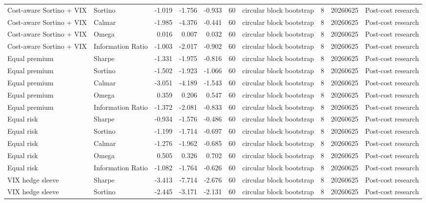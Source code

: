 \begin{tabular}{llrrrrlrrl}
Cost-aware Sortino + VIX & Sortino & -1.019 & -1.756 & -0.933 & 60 & circular block bootstrap & 8 & 20260625 & Post-cost research \\
Cost-aware Sortino + VIX & Calmar & -1.985 & -4.376 & -0.441 & 60 & circular block bootstrap & 8 & 20260625 & Post-cost research \\
Cost-aware Sortino + VIX & Omega & 0.016 & 0.007 & 0.032 & 60 & circular block bootstrap & 8 & 20260625 & Post-cost research \\
Cost-aware Sortino + VIX & Information Ratio & -1.003 & -2.017 & -0.902 & 60 & circular block bootstrap & 8 & 20260625 & Post-cost research \\
Equal premium & Sharpe & -1.331 & -1.975 & -0.816 & 60 & circular block bootstrap & 8 & 20260625 & Post-cost research \\
Equal premium & Sortino & -1.502 & -1.923 & -1.066 & 60 & circular block bootstrap & 8 & 20260625 & Post-cost research \\
Equal premium & Calmar & -3.051 & -4.189 & -1.543 & 60 & circular block bootstrap & 8 & 20260625 & Post-cost research \\
Equal premium & Omega & 0.359 & 0.206 & 0.547 & 60 & circular block bootstrap & 8 & 20260625 & Post-cost research \\
Equal premium & Information Ratio & -1.372 & -2.081 & -0.833 & 60 & circular block bootstrap & 8 & 20260625 & Post-cost research \\
Equal risk & Sharpe & -0.934 & -1.576 & -0.486 & 60 & circular block bootstrap & 8 & 20260625 & Post-cost research \\
Equal risk & Sortino & -1.199 & -1.714 & -0.697 & 60 & circular block bootstrap & 8 & 20260625 & Post-cost research \\
Equal risk & Calmar & -1.276 & -1.962 & -0.685 & 60 & circular block bootstrap & 8 & 20260625 & Post-cost research \\
Equal risk & Omega & 0.505 & 0.326 & 0.702 & 60 & circular block bootstrap & 8 & 20260625 & Post-cost research \\
Equal risk & Information Ratio & -1.082 & -1.764 & -0.626 & 60 & circular block bootstrap & 8 & 20260625 & Post-cost research \\
VIX hedge sleeve & Sharpe & -3.413 & -7.714 & -2.676 & 60 & circular block bootstrap & 8 & 20260625 & Post-cost research \\
VIX hedge sleeve & Sortino & -2.445 & -3.171 & -2.131 & 60 & circular block bootstrap & 8 & 20260625 & Post-cost research \\

\end{tabular}
